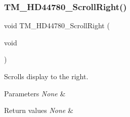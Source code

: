 \subsubsection{\texorpdfstring{T\+M\+\_\+\+H\+D44780\+\_\+\+Scroll\+Right()}{TM\_HD44780\_ScrollRight()}}
{\footnotesize\ttfamily void T\+M\+\_\+\+H\+D44780\+\_\+\+Scroll\+Right (\begin{DoxyParamCaption}\item[{void}]{ }\end{DoxyParamCaption})}



Scrolls display to the right. 


\begin{DoxyParams}{Parameters}
{\em None} & \\
\hline
\end{DoxyParams}

\begin{DoxyRetVals}{Return values}
{\em None} & \\
\hline
\end{DoxyRetVals}
